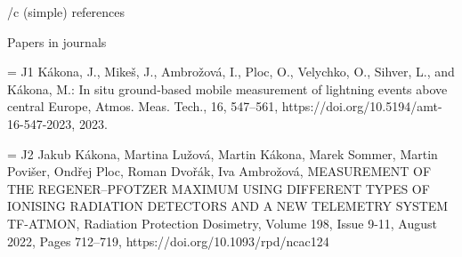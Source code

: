 \bibchap

\usebib/c (simple) references

\specialbibs

\secc Papers in journals
 
\bib[j1] = {J1} Kákona, J., Mikeš, J., Ambrožová, I., Ploc, O., Velychko, O., Sihver, L., and Kákona, M.: In situ ground-based mobile measurement of lightning events above central Europe, Atmos. Meas. Tech., 16, 547–561, https://doi.org/10.5194/amt-16-547-2023, 2023.
 
\bib[j2] = {J2} Jakub Kákona, Martina Lužová, Martin Kákona, Marek Sommer, Martin Povišer, Ondřej Ploc, Roman Dvořák, Iva Ambrožová, MEASUREMENT OF THE REGENER–PFOTZER MAXIMUM USING DIFFERENT TYPES OF IONISING RADIATION DETECTORS AND A NEW TELEMETRY SYSTEM TF-ATMON, Radiation Protection Dosimetry, Volume 198, Issue 9-11, August 2022, Pages 712–719, https://doi.org/10.1093/rpd/ncac124


\bye
